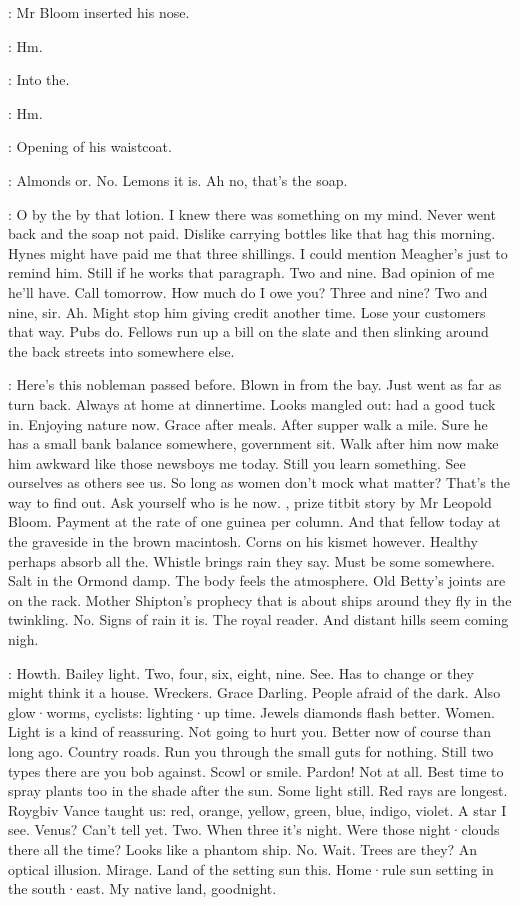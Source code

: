 :
Mr Bloom inserted his nose.

\Bloom:
Hm.

:
Into the.

\Bloom:
Hm.

:
Opening of his waistcoat.

\Bloom:
Almonds or.
No.
Lemons
it is.
Ah no,
that's the soap.

\Bloom:
O by the by
that lotion.
I knew there was something on my mind.
Never went back
and the soap not paid.
Dislike carrying bottles
like that hag this morning.
Hynes might have paid me that three shillings.
I could mention Meagher's
just to remind him.
Still
if he works that paragraph.
Two and nine.
Bad opinion of me he'll have.
Call tomorrow.
How much do I owe you?
Three and nine?
Two and nine,
sir.
Ah.
Might stop him
giving credit another time.
Lose your customers that way.
Pubs do.
Fellows run up a bill on the slate
and then slinking around the back streets
into somewhere else.

\Bloom:
Here's this nobleman passed before.
Blown in from the bay.
Just went as far as
turn back.
Always at home at dinnertime.
Looks mangled out:
had a good tuck in.
Enjoying nature now.
Grace after meals.
After supper
walk a mile.
Sure he has a small bank balance somewhere,
government sit.
Walk after him now
make him awkward
like those newsboys me
today.
Still
you learn something.
See ourselves
as others see us.
So long as women don't mock
what matter?
That's the way to find out.
Ask yourself
who is he now.
,
prize titbit story
by Mr Leopold Bloom.
Payment at the rate of one guinea per column.
And that fellow today
at the graveside in the brown macintosh.
Corns on his kismet however.
Healthy perhaps
absorb all the.
Whistle brings rain
they say.
Must be some
somewhere.
Salt in the Ormond damp.
The body feels the atmosphere.
Old Betty's joints are on the rack.
Mother Shipton's prophecy
that is
about ships around
they fly in the twinkling.
No.
Signs of rain
it is.
The royal reader.
And distant hills seem coming nigh.

\Bloom:
Howth.
Bailey light.
Two,
four,
six,
eight,
nine.
See.
Has to change
or they might think it a house.
Wreckers.
Grace Darling.
People afraid of the dark.
Also glow·worms,
cyclists:
lighting·up time.
Jewels
diamonds
flash better.
Women.
Light is a kind of reassuring.
Not going to hurt you.
Better now
of course
than long ago.
Country roads.
Run you through the small guts
for nothing.
Still
two types there are
you bob against.
Scowl or smile.
Pardon!
Not at all.
Best time to spray plants too
in the shade after the sun.
Some light still.
Red rays are longest.
Roygbiv
Vance taught us:
red,
orange,
yellow,
green,
blue,
indigo,
violet.
A star
I see.
Venus?
Can't tell yet.
Two.
When three
it's night.
Were those night·clouds there
all the time?
Looks like a phantom ship.
No.
Wait.
Trees
are they?
An optical illusion.
Mirage.
Land of the setting sun
this.
Home·rule sun setting in the south·east.
My native land,
goodnight.

